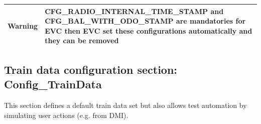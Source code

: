\begin{itemize}
\begin{longtable}{|l|l|}
				\hline

					\begin{minipage}[t]{0.22\linewidth} \textbf{Warning}	\end{minipage}
				&	\begin{minipage}[t]{0.78\linewidth} CFG\_RADIO\_INTERNAL\_TIME\_STAMP and CFG\_BAL\_WITH\_ODO\_STAMP are mandatories for EVC then EVC set these configurations automatically and they can be removed \end{minipage} \\

				\hline

			\end{longtable}
	\end{itemize}

\subsection{Train data configuration section: Config\_TrainData}
This section defines a default train data set but also allows test automation by simulating user actions (e.g. from DMI).
